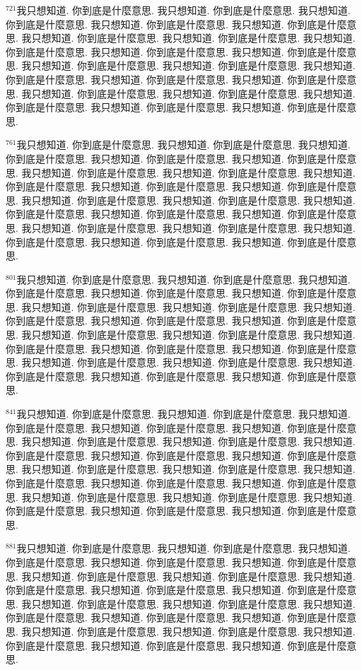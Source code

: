 \documentclass{book}
\begin{document}
$^{721}$我只想知道.
你到底是什麼意思.
我只想知道.
你到底是什麼意思.
我只想知道.
你到底是什麼意思.
我只想知道.
你到底是什麼意思.
我只想知道.
你到底是什麼意思.
我只想知道.
你到底是什麼意思.
我只想知道.
你到底是什麼意思.
我只想知道.
你到底是什麼意思.
我只想知道.
你到底是什麼意思.
我只想知道.
你到底是什麼意思.
我只想知道.
你到底是什麼意思.
我只想知道.
你到底是什麼意思.
我只想知道.
你到底是什麼意思.
我只想知道.
你到底是什麼意思.
我只想知道.
你到底是什麼意思.
我只想知道.
你到底是什麼意思.
我只想知道.
你到底是什麼意思.
我只想知道.
你到底是什麼意思.
我只想知道.
你到底是什麼意思.
我只想知道.
你到底是什麼意思.

$^{761}$我只想知道.
你到底是什麼意思.
我只想知道.
你到底是什麼意思.
我只想知道.
你到底是什麼意思.
我只想知道.
你到底是什麼意思.
我只想知道.
你到底是什麼意思.
我只想知道.
你到底是什麼意思.
我只想知道.
你到底是什麼意思.
我只想知道.
你到底是什麼意思.
我只想知道.
你到底是什麼意思.
我只想知道.
你到底是什麼意思.
我只想知道.
你到底是什麼意思.
我只想知道.
你到底是什麼意思.
我只想知道.
你到底是什麼意思.
我只想知道.
你到底是什麼意思.
我只想知道.
你到底是什麼意思.
我只想知道.
你到底是什麼意思.
我只想知道.
你到底是什麼意思.
我只想知道.
你到底是什麼意思.
我只想知道.
你到底是什麼意思.
我只想知道.
你到底是什麼意思.

$^{801}$我只想知道.
你到底是什麼意思.
我只想知道.
你到底是什麼意思.
我只想知道.
你到底是什麼意思.
我只想知道.
你到底是什麼意思.
我只想知道.
你到底是什麼意思.
我只想知道.
你到底是什麼意思.
我只想知道.
你到底是什麼意思.
我只想知道.
你到底是什麼意思.
我只想知道.
你到底是什麼意思.
我只想知道.
你到底是什麼意思.
我只想知道.
你到底是什麼意思.
我只想知道.
你到底是什麼意思.
我只想知道.
你到底是什麼意思.
我只想知道.
你到底是什麼意思.
我只想知道.
你到底是什麼意思.
我只想知道.
你到底是什麼意思.
我只想知道.
你到底是什麼意思.
我只想知道.
你到底是什麼意思.
我只想知道.
你到底是什麼意思.
我只想知道.
你到底是什麼意思.

$^{841}$我只想知道.
你到底是什麼意思.
我只想知道.
你到底是什麼意思.
我只想知道.
你到底是什麼意思.
我只想知道.
你到底是什麼意思.
我只想知道.
你到底是什麼意思.
我只想知道.
你到底是什麼意思.
我只想知道.
你到底是什麼意思.
我只想知道.
你到底是什麼意思.
我只想知道.
你到底是什麼意思.
我只想知道.
你到底是什麼意思.
我只想知道.
你到底是什麼意思.
我只想知道.
你到底是什麼意思.
我只想知道.
你到底是什麼意思.
我只想知道.
你到底是什麼意思.
我只想知道.
你到底是什麼意思.
我只想知道.
你到底是什麼意思.
我只想知道.
你到底是什麼意思.
我只想知道.
你到底是什麼意思.
我只想知道.
你到底是什麼意思.
我只想知道.
你到底是什麼意思.

$^{881}$我只想知道.
你到底是什麼意思.
我只想知道.
你到底是什麼意思.
我只想知道.
你到底是什麼意思.
我只想知道.
你到底是什麼意思.
我只想知道.
你到底是什麼意思.
我只想知道.
你到底是什麼意思.
我只想知道.
你到底是什麼意思.
我只想知道.
你到底是什麼意思.
我只想知道.
你到底是什麼意思.
我只想知道.
你到底是什麼意思.
我只想知道.
你到底是什麼意思.
我只想知道.
你到底是什麼意思.
我只想知道.
你到底是什麼意思.
我只想知道.
你到底是什麼意思.
我只想知道.
你到底是什麼意思.
我只想知道.
你到底是什麼意思.
我只想知道.
你到底是什麼意思.
我只想知道.
你到底是什麼意思.
我只想知道.
你到底是什麼意思.
我只想知道.
你到底是什麼意思.
\end{document}
